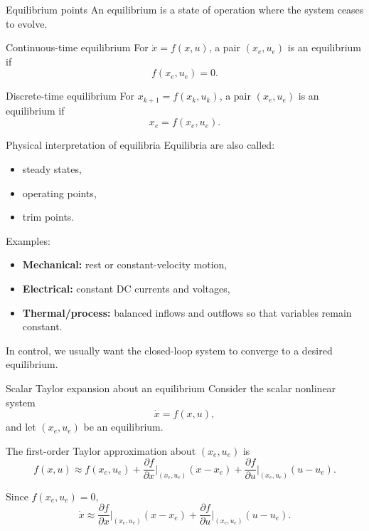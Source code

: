 \documentclass[aspectratio=169,10pt]{beamer}
\begin{document}
\begin{frame}{Equilibrium points}
An equilibrium is a state of operation where the system ceases to evolve.

\begin{defnbox}{Continuous-time equilibrium}
For \(\dot{x}=f(x,u)\), a pair \((x_e,u_e)\) is an equilibrium if
\[
f(x_e,u_e)=0.
\]
\end{defnbox}

\begin{defnbox}{Discrete-time equilibrium}
For \(x_{k+1}=f(x_k,u_k)\), a pair \((x_e,u_e)\) is an equilibrium if
\[
x_e = f(x_e,u_e).
\]
\end{defnbox}
\end{frame}

\begin{frame}{Physical interpretation of equilibria}
Equilibria are also called:
\begin{itemize}
  \item steady states,
  \item operating points,
  \item trim points.
\end{itemize}

Examples:
\begin{itemize}
  \item \textbf{Mechanical:} rest or constant-velocity motion,
  \item \textbf{Electrical:} constant DC currents and voltages,
  \item \textbf{Thermal/process:} balanced inflows and outflows so that variables remain constant.
\end{itemize}

In control, we usually want the closed-loop system to converge to a desired equilibrium.
\end{frame}

\begin{frame}{Scalar Taylor expansion about an equilibrium}
Consider the scalar nonlinear system
\[
\dot{x}=f(x,u),
\]
and let \((x_e,u_e)\) be an equilibrium.

The first-order Taylor approximation about \((x_e,u_e)\) is
\[
f(x,u)\approx f(x_e,u_e)
+\frac{\partial f}{\partial x}\Big|_{(x_e,u_e)}(x-x_e)
+\frac{\partial f}{\partial u}\Big|_{(x_e,u_e)}(u-u_e).
\]

Since \(f(x_e,u_e)=0\),
\[
\dot{x}\approx
\frac{\partial f}{\partial x}\Big|_{(x_e,u_e)}(x-x_e)
+
\frac{\partial f}{\partial u}\Big|_{(x_e,u_e)}(u-u_e).
\]
\end{frame}
\end{document}
